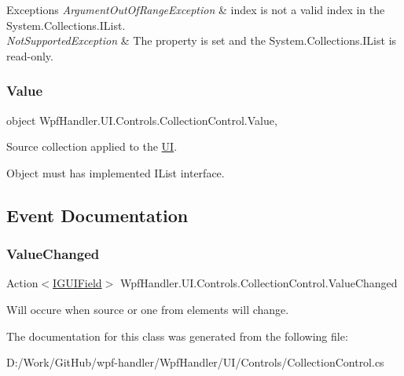 \begin{DoxyExceptions}{Exceptions}
{\em Argument\+Out\+Of\+Range\+Exception} & index is not a valid index in the System.\+Collections.\+I\+List. \\
\hline
{\em Not\+Supported\+Exception} & The property is set and the System.\+Collections.\+I\+List is read-\/only. \\
\hline
\end{DoxyExceptions}
\mbox{\label{class_wpf_handler_1_1_u_i_1_1_controls_1_1_collection_control_a130ec8fe8e45683069833138833e9356}} 
\subsubsection{\texorpdfstring{Value}{Value}}
{\footnotesize\ttfamily object Wpf\+Handler.\+U\+I.\+Controls.\+Collection\+Control.\+Value\hspace{0.3cm}{\ttfamily [get]}, {\ttfamily [set]}}



Source collection applied to the \mbox{\hyperlink{namespace_wpf_handler_1_1_u_i}{UI}}. 

Object must has implemented I\+List interface. 

\subsection{Event Documentation}
\mbox{\label{class_wpf_handler_1_1_u_i_1_1_controls_1_1_collection_control_a7c24ead5af7dadce18f017f0a93706a2}} 
\subsubsection{\texorpdfstring{Value\+Changed}{ValueChanged}}
{\footnotesize\ttfamily Action$<$\mbox{\hyperlink{interface_wpf_handler_1_1_u_i_1_1_auto_layout_1_1_i_g_u_i_field}{I\+G\+U\+I\+Field}}$>$ Wpf\+Handler.\+U\+I.\+Controls.\+Collection\+Control.\+Value\+Changed}



Will occure when source or one from elements will change. 



The documentation for this class was generated from the following file\+:\begin{DoxyCompactItemize}
\item 
D\+:/\+Work/\+Git\+Hub/wpf-\/handler/\+Wpf\+Handler/\+U\+I/\+Controls/Collection\+Control.\+cs\end{DoxyCompactItemize}
